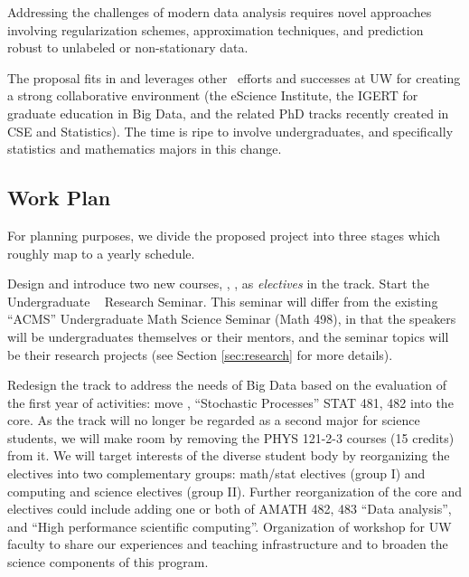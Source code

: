   Addressing the challenges of modern data analysis requires novel approaches
  involving regularization schemes, approximation techniques, and prediction
  robust to unlabeled or non-stationary data.
\item The proposal fits in and leverages other \cdse\ efforts and successes at UW for creating a strong collaborative environment (the eScience Institute, the IGERT for graduate education in Big Data, and the related PhD tracks recently created in CSE and Statistics). The time is ripe to involve undergraduates, and specifically statistics and mathematics majors in this change.
\eit

\subsection{Work Plan}

For planning purposes, we divide the proposed project into three stages which
roughly map to a yearly schedule. 

 Design and introduce two new courses,
\statcl, \astrocl,
as {\em electives} in the track.  Start the Undergraduate \cdse~
Research Seminar. This seminar will differ from the existing ``ACMS''
Undergraduate Math Science Seminar ({\sc Math 498}), in that the
speakers will be undergraduates themselves or their mentors, and the
seminar topics will be their research projects (see Section
\ref{sec:research} for more details).

 Redesign the track to address the needs of Big Data
based on the evaluation of the first year of activities: move \statcl,
``Stochastic Processes'' {\sc STAT 481, 482} into the core. As the track
will no longer be regarded as a second major for science students, we
will make room by removing the {\sc PHYS 121-2-3} courses (15 credits)
from it.  We will target interests of the diverse student body
by reorganizing the electives into two complementary groups:
math/stat electives (group I) and computing and science electives
(group II).  Further reorganization of the core and electives could include
adding one or both of {\sc AMATH 482, 483} ``Data analysis'', and
``High performance scientific computing''.
Organization of workshop for UW faculty to share our experiences and
teaching infrastructure and to broaden the science components of this program.

